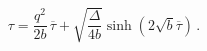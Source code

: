 \begin{equation}
\tau=\frac{q^2}{2b}\,\overline{\tau}+\sqrt{\frac{\Delta}{4b}}
\sinh\left(2\sqrt{b} \overline{\tau}\right)\,.\end{equation}

